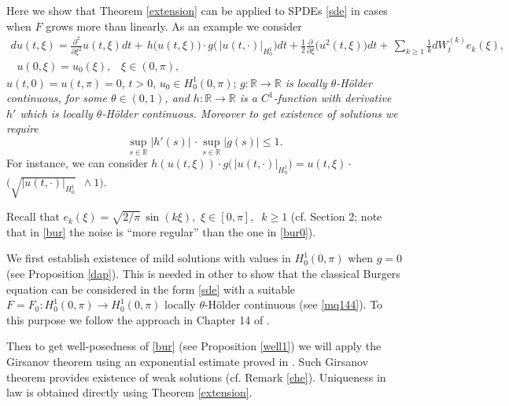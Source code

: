 \documentclass[preprint]{imsart}
\def\R{\mathbb R}
\begin{document}
Here we show that  Theorem \ref{extension} can be applied to  SPDEs \eqref{sde} in cases when  $F$ grows more than linearly. As an example we consider   
  \begin{gather} \label{bur}
d u (t, \xi)=   \frac{\partial^2}{\partial   \xi^2}  u(t, \xi)dt +   \, { h( }u(t, \xi) )\cdot  g \big (\,  \big |  u(t, \cdot ) \big |_{H^1_0 } \big) dt     
\nonumber 
+ \frac{1}{2} \frac{\partial }{\partial \xi} \big ( u^2(t, \xi) \big ) dt +
\, \sum_{k \ge 1 }  
\frac{1}{k}   dW_t^{(k)}  {e_k(\xi)},  
\\  \;\; u(0, \xi) = u_0(\xi), \;\;\; \xi \in (0,\pi),
\end{gather}
 $u(t,0) = u(t,\pi)=0$, $t >0$, $u_0 \in H^1_0(0,\pi)$;  {\sl $g: \R \to \R $ is locally $\theta$-H\"older continuous, for some $\theta \in (0,1)$,  and $h : \R \to \R$ is  a $C^1$-function with derivative $h'$ which is locally $\theta$-H\"older continuous. Moreover to get existence of solutions we require  } 
 \begin{equation}\label{er3}
 \sup_{s \in \R} |h'(s)| \, \cdot  \sup_{s \in \R} |g(s) | \le 1. 
\end{equation}
For instance, we can consider   $  h( u(t, \xi) )\cdot  g \big (\,  \big |  u(t, \cdot ) \big |_{H^1_0 } \big) = u(t, \xi) \cdot  $ $\big(\sqrt{ |  u(t, \cdot ) 
|_{H^1_0 } } \,\,\,  \wedge 1 \big)$.   


  Recall that $
 e_k (\xi) = \sqrt{2/\pi} \,  \sin (k \xi), $ $ \xi \in [0, \pi],\;\; k \ge 1
 $ (cf. Section 2; note that in \eqref{bur} the  noise  is ``more regular'' than  the one in \eqref{bur0}). 

 
  
\vskip 1mm 

 We first  establish existence of  mild solutions with values in $H^1_0(0,\pi)$ when $g=0$ (see Proposition \ref{dap}).  This is needed in other to show that the classical Burgers equation can be considered in the form \eqref{sde}
  with  a suitable $F = F_0 : H^1_0(0,\pi) \to H^1_0(0,\pi) $ locally $\theta$-H\"older continuous  (see  \eqref{mq144}).
  To this purpose we follow the approach in  Chapter 14 of \cite{ergodicity}.
 
 Then to get  well-posedness of \eqref{bur} (see Proposition \ref{well1}) we will apply the Girsanov theorem using   an exponential estimate proved in \cite{burgers}. Such  Girsanov theorem  provides existence of weak solutions (cf. Remark \ref{che}). Uniqueness in law is  obtained directly using Theorem  \ref{extension}.
 
\end{document}
